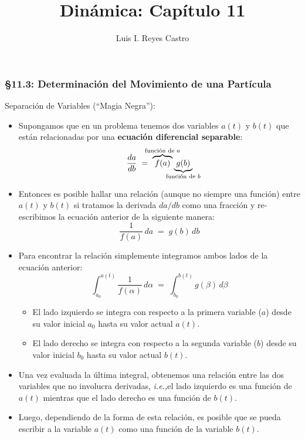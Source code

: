 \documentclass[ 10pt, xcolor = dvipsnames]{beamer}
\title[Din\'amica: Cap\'itulo 11]{Din\'amica: \textbf{Cap\'itulo 11} }
\author[Luis Reyes]{Luis I. Reyes Castro}
\institute[ESPOL]{\normalsize Escuela Superior Polit\'ecnica del Litoral (ESPOL) \\ Guayaquil - Ecuador}
\date[]{}
\newcommand{\ie}{\textit{i.e.,\;}}
\newcommand{\halfcut}{\vspace{-0.5\baselineskip}}
\newcommand{\halfskip}{\vspace{0.5\baselineskip}}
\begin{document}
\begin{frame}[noframenumbering]
\titlepage
\end{frame}

\begin{frame}[allowframebreaks]
\frametitle{\S 11.3: Determinaci\'on del Movimiento de una Part\'icula}

Separaci\'on de Variables (``Magia Negra''): 
\begin{itemize}
\item Supongamos que en un problema tenemos dos variables $a(t)$ y $b(t)$ que \linebreak est\'an relacionadas por una \textbf{ecuaci\'on diferencial separable}: 
\[
\frac{da}{db} \; = \; \overbrace{ \; f(a) \; }^{ \mathclap{ \text{funci\'on de $a$} } } \underbrace{ \; g(b) \; }_{ \mathclap{ \text{funci\'on de $b$} } }
\]
\item Entonces es posible hallar una relaci\'on (aunque no siempre una funci\'on) entre $a(t)$ y $b(t)$ si tratamos la derivada $da/db$ como una fracci\'on y re-escribimos la ecuaci\'on anterior de la siguiente manera: 
\[
\frac{1}{f(a)} \, da \; = \; g(b) \, db
\]
\item Para encontrar la relaci\'on simplemente integramos ambos lados de la ecuaci\'on anterior: 
\[
\int_{a_0}^{a(t)} \frac{1}{f(\alpha)} \, d\alpha
\; = \; \int_{b_0}^{b(t)} g(\beta) \, d\beta
\]
\halfcut
\begin{itemize}
\item El lado izquierdo se integra con respecto a la primera variable ($a$) desde su \linebreak valor inicial $a_0$ hasta su valor actual $a(t)$. 
\item El lado derecho se integra con respecto a la segunda variable ($b$) desde su \linebreak valor inicial $b_0$ hasta su valor actual $b(t)$. 
\end{itemize}
\halfskip
\item Una vez evaluada la \'ultima integral, obtenemos una relaci\'on entre las dos variables que no involucra derivadas, \ie el lado izquierdo es una funci\'on \linebreak de $a(t)$ mientras que el lado derecho es una funci\'on de $b(t)$. 
\item Luego, dependiendo de la forma de esta relaci\'on, es posible que se pueda escribir a la variable $a(t)$ como una funci\'on de la variable $b(t)$. 
\end{itemize}

\end{frame}
\end{document}
